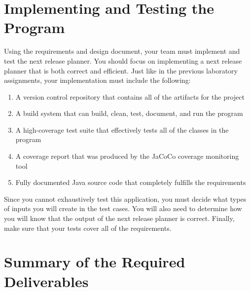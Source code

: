 \section*{Implementing and Testing the Program}

Using the requirements and design document, your team must implement and test the next release planner. You should focus on
implementing a next release planner that is both correct and efficient. Just like in the previous laboratory assignments,
your implementation must include the following:

\vspace*{-.1in}
\begin{enumerate}
\itemsep0em 
	\item A version control repository that contains all of the artifacts for the project
	\item A build system that can build, clean, test, document, and run the program
	\item A high-coverage test suite that effectively tests all of the classes in the program
	\item A coverage report that was produced by the JaCoCo coverage monitoring tool
	\item Fully documented Java source code that completely fulfills the requirements
\end{enumerate}
\vspace*{-.1in}

Since you cannot exhaustively test this application, you must decide what types of inputs you will create in the test
cases.  You will also need to determine how you will know that the output of the next release planner is correct.
Finally, make sure that your tests cover all of the requirements.

% 
\section*{Summary of the Required Deliverables}

